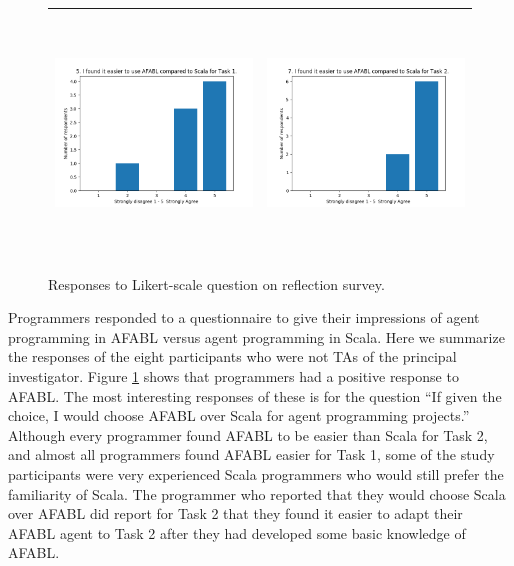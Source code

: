 \begin{figure}[h!]
\begin{tabular}{cc}
  \includegraphics[height=2.5in]{afabl-easier-task1.png} & \includegraphics[height=2.5in]{afabl-easier-task2.png} \\\hline
\end{tabular}
\caption{Responses to Likert-scale question on reflection survey.}
\label{fig:likert-responses}
\end{figure}

Programmers responded to a questionnaire to give their impressions of agent programming in AFABL versus agent programming in Scala. Here we summarize the responses of the eight participants who were not TAs of the principal investigator. Figure \ref{fig:likert-responses} shows that programmers had a positive response to AFABL. The most interesting responses of these is for the question ``If given the choice, I would choose AFABL over Scala for agent programming projects.'' Although every programmer found AFABL to be easier than Scala for Task 2, and almost all programmers found AFABL easier for Task 1, some of the study participants were very experienced Scala programmers who would still prefer the familiarity of Scala. The programmer who reported that they would choose Scala over AFABL did report for Task 2 that they found it easier to adapt their AFABL agent to Task 2 after they had developed some basic knowledge of AFABL.

